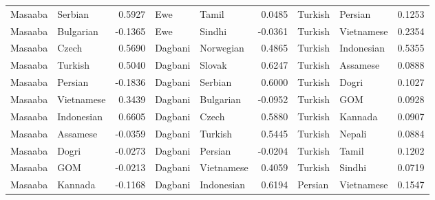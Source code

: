\documentclass[11pt]{article} %
\begin{document}
\begin{table}
\begin{tabular}{llr@{\hspace{12pt}}llr@{\hspace{12pt}}llr}
            Masaaba                      & Serbian             & 0.5927        & Ewe                 & Tamil               & 0.0485        & Turkish             & Persian             & 0.1253        \\
            Masaaba                      & Bulgarian           & -0.1365       & Ewe                 & Sindhi              & -0.0361       & Turkish             & Vietnamese          & 0.2354        \\
            Masaaba                      & Czech               & 0.5690        & Dagbani             & Norwegian           & 0.4865        & Turkish             & Indonesian          & 0.5355        \\
            Masaaba                      & Turkish             & 0.5040        & Dagbani             & Slovak              & 0.6247        & Turkish             & Assamese            & 0.0888        \\
            Masaaba                      & Persian             & -0.1836       & Dagbani             & Serbian             & 0.6000        & Turkish             & Dogri               & 0.1027        \\
            Masaaba                      & Vietnamese          & 0.3439        & Dagbani             & Bulgarian           & -0.0952       & Turkish             & GOM                 & 0.0928        \\
            Masaaba                      & Indonesian          & 0.6605        & Dagbani             & Czech               & 0.5880        & Turkish             & Kannada             & 0.0907        \\
            Masaaba                      & Assamese            & -0.0359       & Dagbani             & Turkish             & 0.5445        & Turkish             & Nepali              & 0.0884        \\
            Masaaba                      & Dogri               & -0.0273       & Dagbani             & Persian             & -0.0204       & Turkish             & Tamil               & 0.1202        \\
            Masaaba                      & GOM                 & -0.0213       & Dagbani             & Vietnamese          & 0.4059        & Turkish             & Sindhi              & 0.0719        \\
            Masaaba                      & Kannada             & -0.1168       & Dagbani             & Indonesian          & 0.6194        & Persian             & Vietnamese          & 0.1547        \\

\end{tabular}
\end{table}
\end{document}
